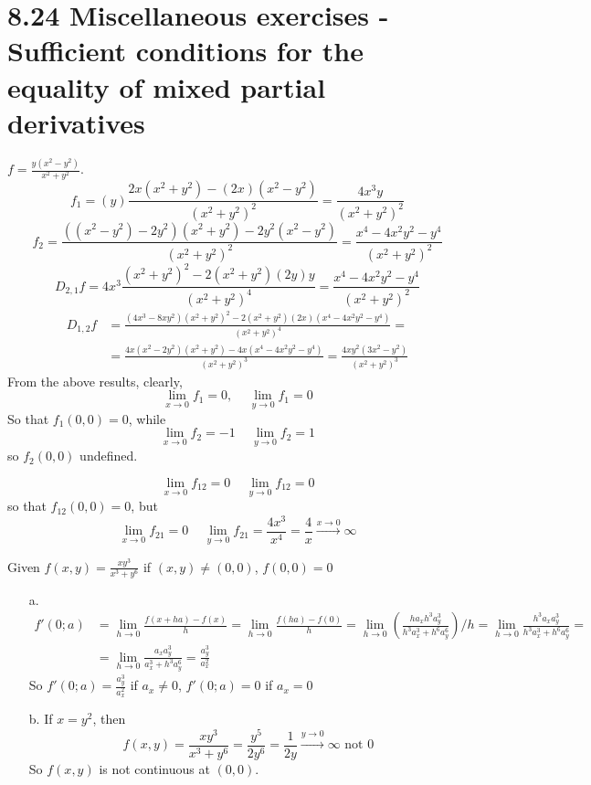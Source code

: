 \documentclass[twoside]{amsart}
\theoremstyle{plain}
\theoremstyle{definition}
\newcommand{\exercisehead}[1]
  {
   \noindent{\small\bf Exercise #1.}
   \smallskip}
\begin{document}
\section*{ 8.24 Miscellaneous exercises - Sufficient conditions for the equality of mixed partial derivatives }

\exercisehead{2} $f = \frac{ y (x^2 - y^2)}{ x^2 +y^2 }$.  
\[
f_1 = (y) \frac{ 2x (x^2 + y^2) - (2x)(x^2 - y^2) }{ (x^2 + y^2)^2} = \frac{ 4 x^3 y}{ (x^2 +y^2)^2 }
\]
\[
f_2 = \frac{ ( (x^2 -y^2 ) - 2y^2 )(x^2 + y^2) - 2y^2 (x^2 - y^2 ) }{ (x^2 + y^2 )^2} = \frac{ x^4 - 4 x^2 y^2 - y^4 }{ (x^2 +y^2 )^2 }
\]
\[
D_{2,1} f= 4x^3 \frac{ (x^2 +y^2)^2 - 2(x^2 + y^2 )( 2y) y }{ (x^2 +y^2)^4} = \frac{ x^4 - 4x^2 y^2 - y^4}{ (x^2 +y^2)^2 }
\]
\[
\begin{aligned}
  D_{1,2} f & = \frac{ (4x^3 - 8xy^2) (x^2 + y^2)^2 - 2(x^2 + y^2) (2x) ( x^4 - 4x^2 y^2 - y^4) }{ (x^2 +y^2)^4 }  = \\
  & = \frac{ 4x(x^2 - 2y^2)(x^2 + y^2) - 4x (x^4 - 4x^2 y^2 - y^4) }{ (x^2  +y^2)^3}  = \frac{ 4xy^2 ( 3x^2  -y^2) }{ (x^2  +y^2)^3 }
\end{aligned}
\]
From the above results, clearly,
\[
\lim_{x \to 0} f_1 =  0, \quad \, \lim_{y\to 0} f_1 = 0 
\]
So that $\boxed{ f_1(0,0) = 0 }$, while
\[
\lim_{x \to 0 } f_2 = -1 \quad \, \lim_{y\to 0} f_2 =  1 
\]
so $f_2(0,0)$ undefined.  

\[
\lim_{x \to 0} f_{12} =0 \quad \, \lim_{ y\to 0} f_{12} = 0 
\]
so that $\boxed{ f_{12}(0,0)= 0}$, but
\[
\lim_{x\to 0} f_{21} =0 \quad \, \lim_{y \to 0} f_{21} = \frac{4x^3}{x^4} = \frac{4}{x} \xrightarrow{ x\to 0} \infty
\]

\exercisehead{3} Given $f(x,y) = \frac{ xy^3 }{ x^3 + y^6 }$ if $(x,y) \neq (0,0)$, $f(0,0) = 0$
\begin{itemize}
\item[a.]
\[
\begin{aligned}
  f'(0;a) & = \lim_{h\to 0} \frac{ f(x+ha) - f(x)}{h} = \lim_{h\to 0 } \frac{f(ha) - f(0) }{ h } = \lim_{h\to 0} \left( \frac{ h a_x h^3 a_y^3 }{ h^3 a_x^3 + h^6 a_y^6 } \right)/h = \lim_{h\to 0} \frac{ h^3 a_x a_y^3 }{ h^3 a_x^3 + h^6 a_y^6 } = \\
    & = \lim_{h\to 0} \frac{ a_x a_y^3 }{ a_x^3 + h^3 a_y^6} = \frac{ a_y^3}{a_x^2 }
\end{aligned}
\]
So $f'(0;a) = \frac{ a_y^3}{a_x^2 }$ if $a_x \neq 0$, $f'(0;a) = 0$ if $a_x = 0$
\item[b.] If $x=y^2$, then 
\[
f(x,y) = \frac{ xy^3}{x^3 + y^6} = \frac{ y^5 }{ 2y^6} = \frac{1}{ 2y} \xrightarrow{ y\to 0 } \infty \text{ not } 0
\]
So $f(x,y)$ is not continuous at $(0,0)$.  
\end{itemize}
\end{document}
